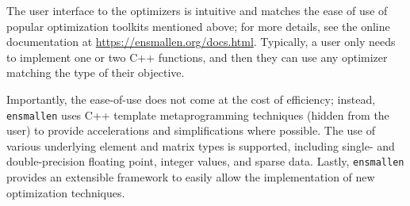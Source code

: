 \documentclass[twoside,11pt]{article}
\begin{document}
%
%
%

The user interface to the optimizers is intuitive
and matches the ease of use of popular
optimization toolkits mentioned above; for more details, see
the online documentation at
\mbox{\url{https://ensmallen.org/docs.html}}.
Typically, a user only needs to implement one or two {C++}
functions, and then they can use any optimizer
matching the type of their objective.

Importantly, the ease-of-use does not come at the cost of efficiency; instead,
{\tt ensmallen} uses C++ template metaprogramming techniques (hidden from the
user) to provide accelerations and simplifications where possible.
The use of various underlying element and matrix types is supported,
including single- and double-precision floating point,
integer values, and sparse data.
Lastly, {\tt ensmallen} provides an extensible framework to easily allow the implementation of new optimization techniques.
\end{document}
